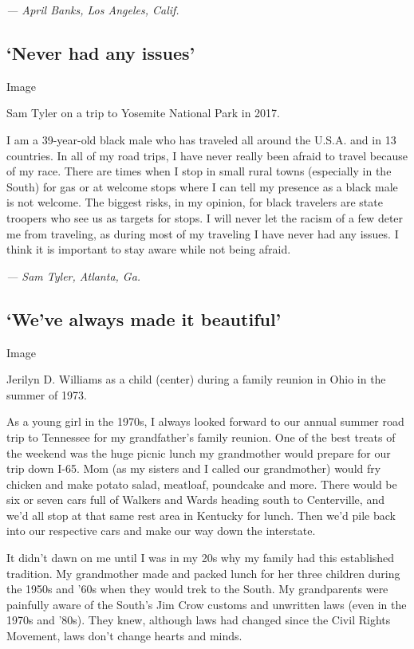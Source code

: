 \emph{--- April Banks, Los Angeles, Calif.}

\hypertarget{never-had-any-issues}{%
\subsection{`Never had any issues'}\label{never-had-any-issues}}

Image

Sam Tyler on a trip to Yosemite National Park in 2017.

I am a 39-year-old black male who has traveled all around the U.S.A. and
in 13 countries. In all of my road trips, I have never really been
afraid to travel because of my race. There are times when I stop in
small rural towns (especially in the South) for gas or at welcome stops
where I can tell my presence as a black male is not welcome. The biggest
risks, in my opinion, for black travelers are state troopers who see us
as targets for stops. I will never let the racism of a few deter me from
traveling, as during most of my traveling I have never had any issues. I
think it is important to stay aware while not being afraid.

\emph{--- Sam Tyler, Atlanta, Ga.}

\hypertarget{weve-always-made-it-beautiful}{%
\subsection{`We've always made it
beautiful'}\label{weve-always-made-it-beautiful}}

Image

Jerilyn D. Williams as a child (center) during a family reunion in Ohio
in the summer of 1973.

As a young girl in the 1970s, I always looked forward to our annual
summer road trip to Tennessee for my grandfather's family reunion. One
of the best treats of the weekend was the huge picnic lunch my
grandmother would prepare for our trip down I-65. Mom (as my sisters and
I called our grandmother) would fry chicken and make potato salad,
meatloaf, poundcake and more. There would be six or seven cars full of
Walkers and Wards heading south to Centerville, and we'd all stop at
that same rest area in Kentucky for lunch. Then we'd pile back into our
respective cars and make our way down the interstate.

It didn't dawn on me until I was in my 20s why my family had this
established tradition. My grandmother made and packed lunch for her
three children during the 1950s and '60s when they would trek to the
South. My grandparents were painfully aware of the South's Jim Crow
customs and unwritten laws (even in the 1970s and '80s). They knew,
although laws had changed since the Civil Rights Movement, laws don't
change hearts and minds.

